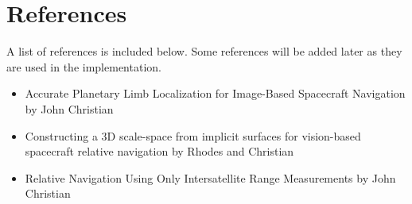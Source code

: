 \documentclass[12pt,letterpaper,openany,fleqn]{report}
\begin{document}
	\chapter{References}
	A list of references is included below. Some references will be added later as they are used in the implementation.
	\begin{itemize}
		\item Accurate Planetary Limb Localization for Image-Based
		Spacecraft Navigation by John Christian
		\item Constructing a 3D scale-space from implicit surfaces for vision-based spacecraft relative navigation by Rhodes and Christian
		\item Relative Navigation Using Only Intersatellite Range Measurements by John Christian
	\end{itemize}
	
\end{document}
